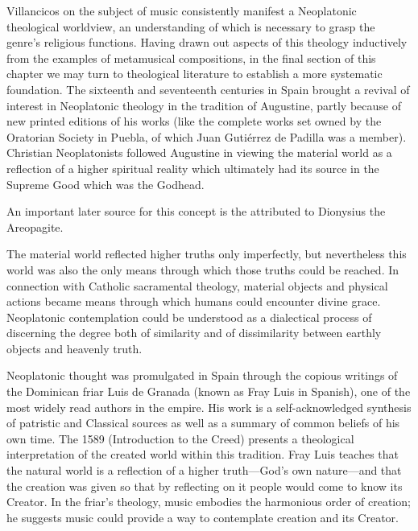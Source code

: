 Villancicos on the subject of music consistently manifest a Neoplatonic
theological worldview, an understanding of which is necessary to grasp the
genre's religious functions.
Having drawn out aspects of this theology inductively from the examples of
metamusical compositions, in the final section of this chapter we may turn to
theological literature to establish a more systematic foundation.
The sixteenth and seventeenth centuries in Spain brought a revival of interest
in Neoplatonic theology in the tradition of Augustine, partly because of new
printed editions of his works (like the complete works set owned by the
Oratorian Society in Puebla, of which Juan Gutiérrez de Padilla was a member).%
    \Autocites
    {Augustine:Opera1555}
    {Weber:ReligiousLitSpain}
    {Mauleon:PadillaCivil}
Christian Neoplatonists followed Augustine in viewing the material
world as a reflection of a higher spiritual reality which ultimately had its
source in the Supreme Good which was the Godhead.%
\begin{Footnote}
    An important later source for this concept is the  attributed to Dionysius the Areopagite.
\end{Footnote}
The material world reflected higher truths only imperfectly, but nevertheless
this world was also the only means through which those truths could be reached.
In connection with Catholic sacramental theology, material objects and physical
actions became means through which humans could encounter divine grace.
Neoplatonic contemplation could be understood as a dialectical process of
discerning the degree both of similarity and of dissimilarity between earthly
objects and heavenly truth.

Neoplatonic thought was promulgated in Spain through the copious writings of
the Dominican friar Luis de Granada (known as Fray Luis in Spanish), one of the
most widely read authors in the empire.%
    \Autocite{Weber:ReligiousLitSpain}
His work is a self-acknowledged synthesis of patristic and Classical
sources as well as a summary of common beliefs of his own time.
The 1589  (Introduction to the Creed)
presents a theological interpretation of the created world within this
tradition.%
    \Autocites
    {LuisdeGranada-Balcells:SimboloPtI}
    {LuisdeGranada:Simbolo}
Fray Luis teaches that the natural world is a reflection of a higher
truth---God's own nature---and that the creation was given so that by
reflecting on it people would come to know its Creator.
In the friar's theology, music embodies the harmonious order of creation; he
suggests music could provide a way to contemplate creation and its
Creator.

